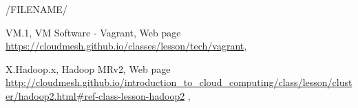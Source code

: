 /FILENAME/

VM.1, VM Software - Vagrant, Web page
\url{https://cloudmesh.github.io/classes/lesson/tech/vagrant}, 

X.Hadoop.x, Hadoop MRv2, Web page \url{http://cloudmesh.github.io/introduction_to_cloud_computing/class/lesson/cluster/hadoop2.html#ref-class-lesson-hadoop2} ,



